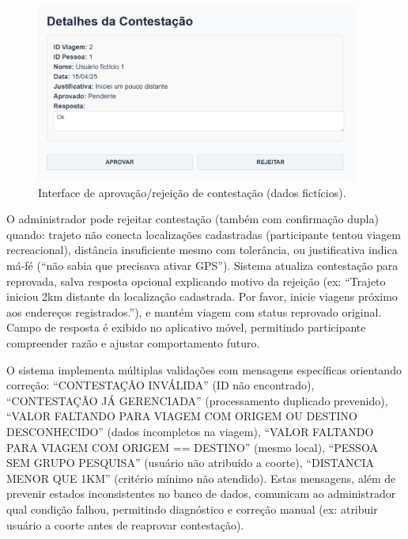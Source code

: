  
\begin{figure}[htb]
    \centering
    \includegraphics[width=0.95\textwidth]{figuras/contestacao_aprovar.PNG}
    \caption{Interface de aprovação/rejeição de contestação (dados fictícios).}
    \label{fig:contestacao_aprovar}
  \end{figure}

O administrador pode rejeitar contestação (também com confirmação dupla) quando: trajeto não conecta localizações cadastradas (participante tentou viagem recreacional), distância insuficiente mesmo com tolerância, ou justificativa indica má-fé (``não sabia que precisava ativar GPS''). Sistema atualiza contestação para reprovada, salva resposta opcional explicando motivo da rejeição (ex: ``Trajeto iniciou 2km distante da localização cadastrada. Por favor, inicie viagens próximo aos endereços registrados.''), e mantém viagem com status reprovado original. Campo de resposta é exibido no aplicativo móvel, permitindo participante compreender razão e ajustar comportamento futuro.

O sistema implementa múltiplas validações com mensagens específicas orientando correção: ``CONTESTAÇÃO INVÁLIDA'' (ID não encontrado), ``CONTESTAÇÃO JÁ GERENCIADA'' (processamento duplicado prevenido), ``VALOR FALTANDO PARA VIAGEM COM ORIGEM OU DESTINO DESCONHECIDO'' (dados incompletos na viagem), ``VALOR FALTANDO PARA VIAGEM COM ORIGEM == DESTINO'' (mesmo local), ``PESSOA SEM GRUPO PESQUISA'' (usuário não atribuído a coorte), ``DISTANCIA MENOR QUE 1KM'' (critério mínimo não atendido). Estas mensagens, além de prevenir estados inconsistentes no banco de dados, comunicam ao administrador qual condição falhou, permitindo diagnóstico e correção manual (ex: atribuir usuário a coorte antes de reaprovar contestação).
